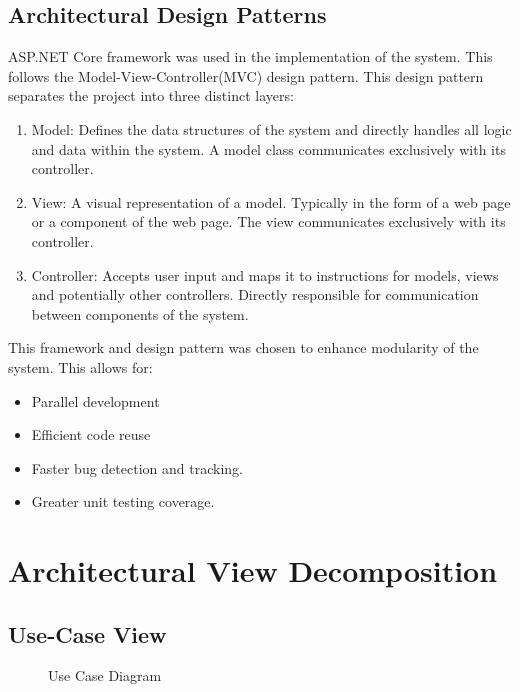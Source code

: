 \documentclass[11pt]{article}
\begin{document}
\subsection{Architectural Design Patterns}
ASP.NET Core framework was used in the implementation of the system. This follows the Model-View-Controller(MVC) design pattern. This design pattern separates the project into three distinct layers:

\begin{enumerate}
	\item Model: Defines the data structures of the system and directly handles all logic and data within the system. A model class communicates exclusively with its controller.
	\item View: A visual representation of a model. Typically in the form of a web page or a component of the web page. The view communicates exclusively with its controller.
	\item Controller: Accepts user input and maps it to instructions for models, views and potentially other controllers. Directly responsible for communication between components of the system.
	
	  
\end{enumerate} 

This framework and design pattern was chosen to enhance modularity of the system. This allows for: 
\begin{itemize}
	\item Parallel development
	\item Efficient code reuse
	\item Faster bug detection and tracking.
	\item Greater unit testing coverage.
	
\end{itemize} 
 
\section{Architectural View Decomposition}
\subsection{Use-Case View}
\begin{figure}[H]
	\caption{Use Case Diagram}
\end{figure}
\end{document}
